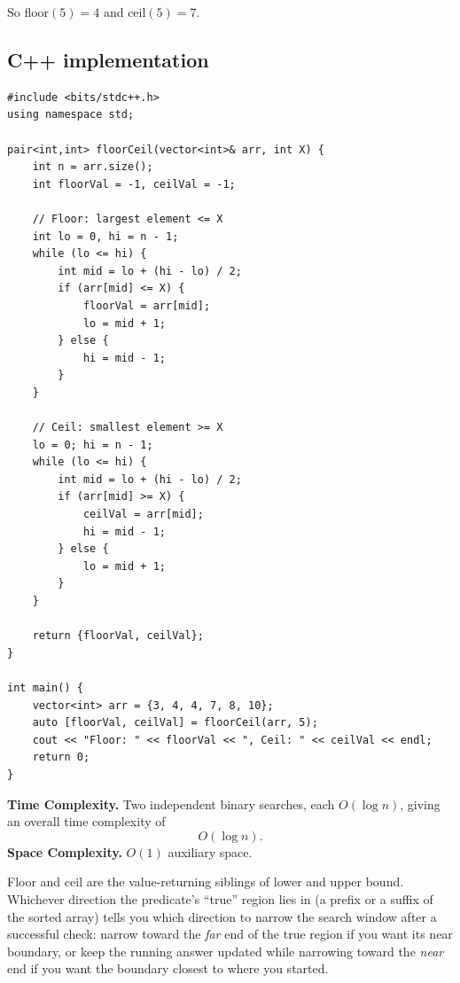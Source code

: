 So floor$(5) = 4$ and ceil$(5) = 7$.

\subsection*{C++ implementation}

\begin{lstlisting}
#include <bits/stdc++.h>
using namespace std;

pair<int,int> floorCeil(vector<int>& arr, int X) {
    int n = arr.size();
    int floorVal = -1, ceilVal = -1;

    // Floor: largest element <= X
    int lo = 0, hi = n - 1;
    while (lo <= hi) {
        int mid = lo + (hi - lo) / 2;
        if (arr[mid] <= X) {
            floorVal = arr[mid];
            lo = mid + 1;
        } else {
            hi = mid - 1;
        }
    }

    // Ceil: smallest element >= X
    lo = 0; hi = n - 1;
    while (lo <= hi) {
        int mid = lo + (hi - lo) / 2;
        if (arr[mid] >= X) {
            ceilVal = arr[mid];
            hi = mid - 1;
        } else {
            lo = mid + 1;
        }
    }

    return {floorVal, ceilVal};
}

int main() {
    vector<int> arr = {3, 4, 4, 7, 8, 10};
    auto [floorVal, ceilVal] = floorCeil(arr, 5);
    cout << "Floor: " << floorVal << ", Ceil: " << ceilVal << endl;
    return 0;
}
\end{lstlisting}

\begin{complexitybox}
\textbf{Time Complexity.} Two independent binary searches, each
$O(\log n)$, giving an overall time complexity of
\[
  O(\log n).
\]
\textbf{Space Complexity.} $O(1)$ auxiliary space.
\end{complexitybox}

\begin{takeawaybox}
Floor and ceil are the value-returning siblings of lower and upper bound.
Whichever direction the predicate's ``true'' region lies in (a prefix or a
suffix of the sorted array) tells you which direction to narrow the search
window after a successful check: narrow toward the \emph{far} end of the
true region if you want its near boundary, or keep the running answer
updated while narrowing toward the \emph{near} end if you want the boundary
closest to where you started.
\end{takeawaybox}
